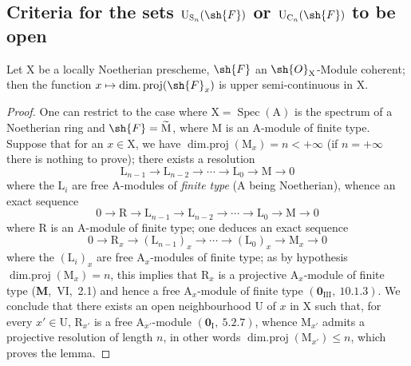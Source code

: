 \subsection{Criteria for the sets \texorpdfstring{$\mathrm{U}_{\mathrm{S}_n}(\sh{F})$}{U\_Sn(F)} or \texorpdfstring{$\mathrm{U}_{\mathrm{C}_n}(\sh{F})$}{U\_Cn(F)} to be open}
\label{subsection:IV.6.11}

\begin{lemma}[6.11.1]
\label{IV.6.11.1}
Let $\mathrm{X}$ be a locally Noetherian prescheme, $\sh{F}$ an $\sh{O}_\mathrm{X}$-Module
coherent; then the function $x\mapsto\operatorname{dim.proj}(\sh{F}_x)$ is upper semi-continuous in $\mathrm{X}$.
\end{lemma}

\begin{proof}
One can restrict to the case where $\mathrm{X}=\operatorname{Spec}(\mathrm{A})$ is the spectrum of a Noetherian ring
and $\sh{F}=\widetilde{\mathrm{M}}$, where $\mathrm{M}$ is an $\mathrm{A}$-module of finite type. Suppose that for an $x\in\mathrm{X}$, we have
$\operatorname{dim.proj}(\mathrm{M}_x)=n<+\infty$ (if $n=+\infty$ there is nothing to prove); there exists a resolution
\[
  \mathrm{L}_{n-1}\to\mathrm{L}_{n-2}\to\cdots\to\mathrm{L}_0\to\mathrm{M}\to 0
\]
where the $\mathrm{L}_i$ are free $\mathrm{A}$-modules of \emph{finite type} ($\mathrm{A}$ being Noetherian), whence an exact sequence
\[
  0\to\mathrm{R}\to\mathrm{L}_{n-1}\to\mathrm{L}_{n-2}\to\cdots\to\mathrm{L}_0\to\mathrm{M}\to 0
\]
where $\mathrm{R}$ is an $\mathrm{A}$-module of finite type; one deduces an exact sequence
\[
  0\to\mathrm{R}_x\to(\mathrm{L}_{n-1})_x\to\cdots\to(\mathrm{L}_0)_x\to\mathrm{M}_x\to 0
\]
where the $(\mathrm{L}_i)_x$ are free $\mathrm{A}_x$-modules of finite type; as by hypothesis
$\operatorname{dim.proj}(\mathrm{M}_x)=n$, this implies that $\mathrm{R}_x$ is a projective $\mathrm{A}_x$-module of finite type
(\textbf{M},~VI,~2.1) and hence a free $\mathrm{A}_x$-module of finite type $(\mathbf{0}_{\mathrm{III}},~10.1.3)$. We conclude
that there exists an open neighbourhood $\mathrm{U}$ of $x$ in $\mathrm{X}$ such that, for every $x'\in\mathrm{U}$, $\mathrm{R}_{x'}$ is a
free $\mathrm{A}_{x'}$-module $(\mathbf{0}_\mathrm{I},~5.2.7)$, whence $\mathrm{M}_{x'}$ admits a projective resolution of length $n$,
in other words $\operatorname{dim.proj}(\mathrm{M}_{x'})\leqslant n$, which proves the lemma.
\end{proof}

